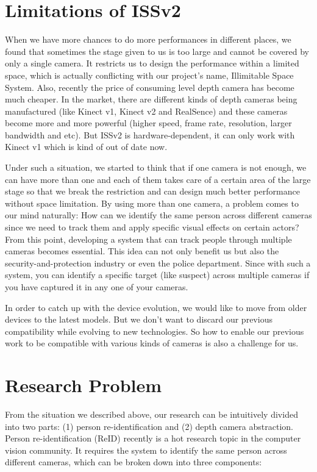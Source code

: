 \section{Limitations of ISSv2}
\label{sec:intro-lim-issv2}

When we have more chances to do more performances in different places,
we found that sometimes the stage given to us is too large and cannot be covered
by only a single camera. It restricts us to design the performance within a
limited space, which is actually conflicting with our project's name, 
Illimitable Space System.
Also, recently the price of consuming level depth camera has become
much cheaper. In the market, there are different kinds of depth cameras
being manufactured (like Kinect v1, Kinect v2 and RealSence) and these cameras
become more and more powerful (higher speed, frame rate, resolution, larger
bandwidth and etc). But ISSv2 is hardware-dependent, it can only work with 
Kinect v1 which is kind of out of date now.

Under such a situation, we started to think that if one camera is
not enough, we can have more than one and each of them takes care of a certain
area of the large stage so that we break the restriction and can design much
better performance without space limitation.
By using more than one camera, a problem comes to our mind naturally: How can
we identify the same person across different cameras since we need to track them
and apply specific visual effects on certain actors?
From this point, developing a system that can track people through multiple
cameras becomes essential.
This idea can not only benefit us but also the security-and-protection industry
or even the police department. Since with such a system, you can identify a
specific target (like suspect) across multiple cameras if you have captured it
in any one of your cameras.

In order to catch up with the device evolution, we would like to move from 
older devices to the latest models. But we don't want to discard our previous 
compatibility while evolving to new technologies. So how to enable our previous 
work to be compatible with various kinds of cameras is also a challenge for us.

\section{Research Problem}
\label{sec:intro-pbstat}

From the situation we described above, our research can be
intuitively divided into two parts: 
(1) person re-identification and
(2) depth camera abstraction.
Person re-identification (ReID) recently is a hot research topic in the
computer vision community. It requires the system to identify the same person
across different cameras, which can be broken down into three components:

